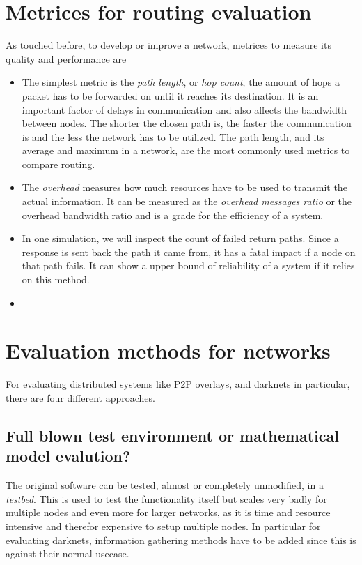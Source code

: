 \section{Metrices for routing evaluation}

As touched before, to develop or improve a network, metrices to measure its quality and performance are 

\begin{itemize}
\item The simplest metric is the \emph{path length}, or \emph{hop count}, the amount of hops a packet has to be forwarded on until it reaches its destination. It is an important factor of delays in communication and also affects the bandwidth between nodes. The shorter the chosen path is, the faster the communication is and the less the network has to be utilized. The path length, and its average and maximum in a network, are the most commonly used metrics to compare routing.

\item The \emph{overhead} measures how much resources have to be used to transmit the actual information. It can be measured as the \emph{overhead messages ratio} or the overhead bandwidth ratio and is a grade for the efficiency of a system.

\item In one simulation, we will inspect the count of failed return paths. Since a response is sent back the path it came from, it has a fatal impact if a node on that path fails. It can show a upper bound of reliability of a system if it relies on this method.

\item {}
\end{itemize}

\section{Evaluation methods for networks}
\label{sec:evaluationmethods}

For evaluating distributed systems like P2P overlays, and darknets in particular, there are four different approaches. 

\subsection{Full blown test environment or mathematical model evalution?}

The original software can be tested, almost or completely unmodified, in a \emph{testbed}. This is used to test the functionality itself but scales very badly for multiple nodes and even more for larger networks, as it is time and resource intensive and therefor expensive to setup multiple nodes. In particular for evaluating darknets, information gathering methods have to be added since this is against their normal usecase.

